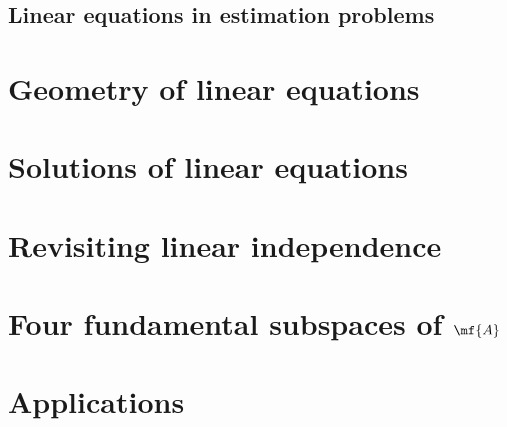 \subsection{Linear equations in estimation problems}


\section{Geometry of linear equations}\label{sec:ch03-geom-lin-eqn}


\section{Solutions of linear equations}


\section{Revisiting linear independence}

\section{Four fundamental subspaces of $\mf{A}$}


\section{Applications}